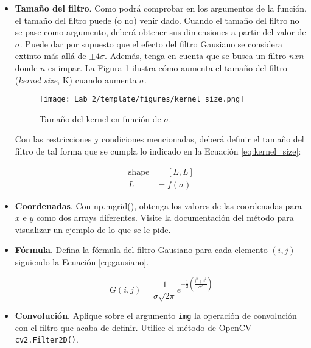 \begin{itemize}
    \item \textbf{Tamaño del filtro}. Como podrá comprobar en los argumentos de la función, el tamaño del filtro puede (o no) venir dado. Cuando el tamaño del filtro no se pase como argumento, deberá obtener sus dimensiones a partir del valor de $\sigma$. Puede dar por supuesto que el efecto del filtro Gausiano se considera extinto más allá de $\pm4\sigma$. Además, tenga en cuenta que se busca un filtro $n x n$ donde $n$ es impar. La Figura \ref{fig:kernel_size} ilustra cómo aumenta el tamaño del filtro (\textit{kernel size}, K) cuando aumenta $\sigma$.

    \begin{figure}[h]
    \centering
    \texttt{[image: Lab\_2/template/figures/kernel\_size.png]}
    \caption{Tamaño del kernel en función de $\sigma$.}
    \label{fig:kernel_size}
    \end{figure}

    Con las restricciones y condiciones mencionadas, deberá definir el tamaño del filtro de tal forma que se cumpla lo indicado en la Ecuación \ref{eq:kernel_size}:

    \begin{align}
     \text{shape} &= [L, L]\\
     L &= f(\sigma)
    \label{eq:kernel_size}
    \end{align}

    
    \item  \textbf{Coordenadas}. Con np.mgrid(), obtenga los valores de las coordenadas para $x$ e $y$ como dos arrays diferentes. Visite la documentación del método para visualizar un ejemplo de lo que se le pide.
    \item  \textbf{Fórmula}. Defina la fórmula del filtro Gausiano para cada elemento $(i, j)$ siguiendo la Ecuación \ref{eq:gausiano}.

    \begin{equation}
    G(i,j) = \frac{1}{\sigma \sqrt{2\pi}} e^{-\frac{1}{2} \left( \frac{i^2 + j^2}{\sigma^2} \right)}
    \label{eq:gausiano}
    \end{equation}

    \item  \textbf{Convolución}. Aplique sobre el argumento \texttt{img} la operación de convolución con el filtro que acaba de definir. Utilice el método de OpenCV \texttt{cv2.Filter2D()}.
\end{itemize}

